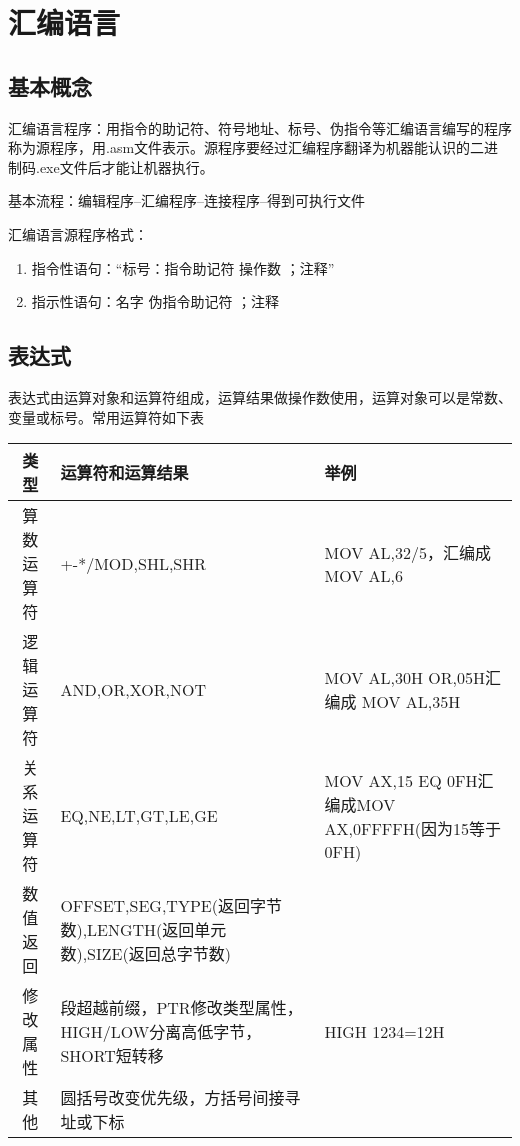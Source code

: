 \chapter{汇编语言}
\section{基本概念}
汇编语言程序：用指令的助记符、符号地址、标号、伪指令等汇编语言编写的程序称为源程序，用.asm文件表示。源程序要经过汇编程序翻译为机器能认识的二进制码.exe文件后才能让机器执行。

基本流程：编辑程序--汇编程序--连接程序--得到可执行文件

汇编语言源程序格式：
\begin{enumerate}
    \item 指令性语句：“标号：指令助记符 操作数 ；注释”
    \item 指示性语句：名字 伪指令助记符 ；注释
\end{enumerate}
\section{表达式}
表达式由运算对象和运算符组成，运算结果做操作数使用，运算对象可以是常数、变量或标号。常用运算符如下表
\begin{table}[H]
    \begin{tabularx}{\textwidth}{|c|X|X|}%
        \hline
        类型 & 运算符和运算结果 & 举例 \\ \hline
        算数运算符 & +-*/MOD,SHL,SHR & MOV AL,32/5，汇编成MOV AL,6\\\hline
        逻辑运算符&AND,OR,XOR,NOT &MOV AL,30H OR,05H汇编成 MOV AL,35H\\\hline
        关系运算符& EQ,NE,LT,GT,LE,GE&MOV AX,15 EQ 0FH汇编成MOV AX,0FFFFH(因为15等于0FH)\\\hline
        数值返回&OFFSET,SEG,TYPE(返回字节数),LENGTH(返回单元数),SIZE(返回总字节数)& \\\hline
        修改属性&段超越前缀，PTR修改类型属性，HIGH/LOW分离高低字节，SHORT短转移 &HIGH 1234=12H\\\hline
        其他&圆括号改变优先级，方括号间接寻址或下标 & \\ \hline
    \end{tabularx}
\end{table}

